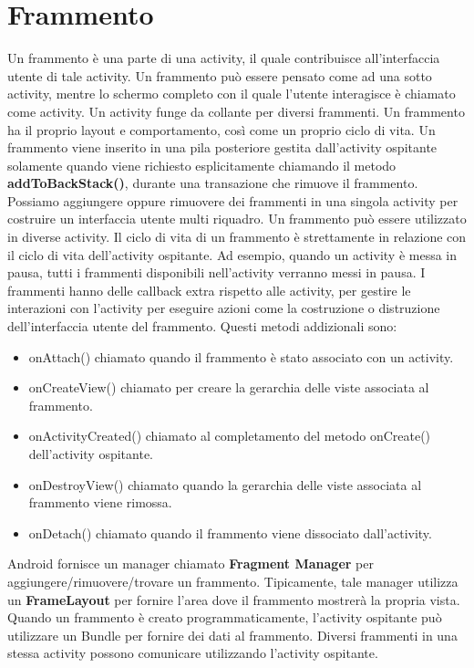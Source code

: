 \section{Frammento}
Un frammento è una parte di una activity, il quale contribuisce all'interfaccia utente di tale activity. Un frammento può essere pensato come ad una sotto activity, mentre lo schermo completo con il quale l'utente interagisce è chiamato come activity. Un activity funge da collante per diversi frammenti. Un frammento ha il proprio layout e comportamento, così come un proprio ciclo di vita.
Un frammento viene inserito in una pila posteriore gestita dall’activity ospitante solamente quando viene richiesto esplicitamente chiamando il metodo \textbf{addToBackStack()}, durante una transazione che rimuove il frammento.
Possiamo aggiungere oppure rimuovere dei frammenti in una singola activity per costruire un interfaccia utente multi riquadro. Un frammento può essere utilizzato in diverse activity.
Il ciclo di vita di un frammento è strettamente in relazione con il ciclo di vita dell'activity ospitante.
Ad esempio, quando un activity è messa in pausa, tutti i frammenti disponibili nell'activity verranno messi in pausa.
I frammenti hanno delle callback extra rispetto alle activity, per gestire le interazioni con l'activity per eseguire azioni come la costruzione o distruzione dell'interfaccia utente del frammento.
Questi metodi addizionali sono:
\begin{itemize}
    \item onAttach() chiamato quando il frammento è stato associato con un activity.
    \item onCreateView() chiamato per creare la gerarchia delle viste associata al frammento.
    \item onActivityCreated() chiamato al completamento del metodo onCreate() dell'activity ospitante.
    \item onDestroyView() chiamato quando la gerarchia delle viste associata al frammento viene rimossa.
    \item onDetach() chiamato quando il frammento viene dissociato dall'activity.
\end{itemize}

Android fornisce un manager chiamato \textbf{Fragment Manager} per aggiungere/rimuovere/trovare un frammento.
Tipicamente, tale manager utilizza un \textbf{FrameLayout} per fornire l'area dove il frammento mostrerà la propria vista. Quando un frammento è creato programmaticamente, l'activity ospitante può utilizzare un Bundle per fornire dei dati al frammento. Diversi frammenti in una stessa activity possono comunicare utilizzando l'activity ospitante.

